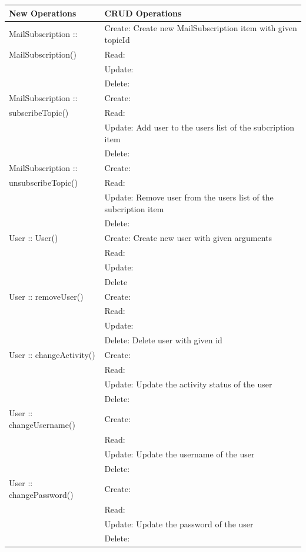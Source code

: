 \begin{longtable}{|p{.3\linewidth}|p{.7\linewidth}|}
    \hline
    New Operations & CRUD Operations \\ \hline
    MailSubscription :: & Create: Create new MailSubscription item with given topicId \\
    MailSubscription()  & Read: \\
                        & Update: \\
                        & Delete: \\ \hline
    MailSubscription :: & Create: \\
    subscribeTopic()    & Read: \\
                        & Update: Add user to the users list of the subcription item \\
                        & Delete: \\ \hline
    MailSubscription :: & Create: \\
    unsubscribeTopic()  & Read: \\
                        & Update: Remove user from the users list of the subcription item \\
                        & Delete: \\ \hline

    User :: User() & Create: Create new user with given arguments \\
                 & Read: \\
                 & Update: \\
                 & Delete \\ \hline
    User :: removeUser() & Create: \\
                       & Read: \\
                       & Update: \\
                       & Delete: Delete user with given id \\ \hline
    User :: changeActivity() & Create: \\
                           & Read: \\
                           & Update: Update the activity status of the user \\
                           & Delete: \\ \hline
    User :: changeUsername() & Create: \\
                           & Read: \\
                           & Update: Update the username of the user \\
                           & Delete: \\ \hline
    User :: changePassword() & Create: \\
                           & Read: \\
                           & Update: Update the password of the user \\
                           & Delete: \\ \hline


\end{longtable}
